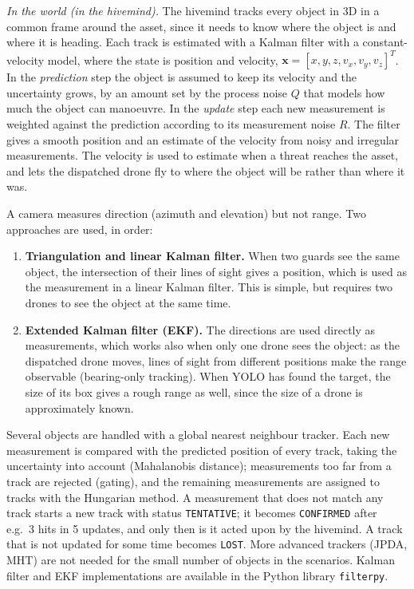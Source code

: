 \documentclass{article}
\begin{document}
\emph{In the world (in the hivemind).} The hivemind tracks every object in
3D in a common frame around the asset, since it needs to know where the
object is and where it is heading. Each track is estimated with a Kalman
filter with a constant-velocity model, where the state is position and
velocity, $\mathbf{x} = [x, y, z, v_x, v_y, v_z]^T$. In the
\emph{prediction} step the object is assumed to keep its velocity and the
uncertainty grows, by an amount set by the process noise $Q$ that models
how much the object can manoeuvre. In the \emph{update} step each new
measurement is weighted against the prediction according to its
measurement noise $R$. The filter gives a smooth position and an estimate
of the velocity from noisy and irregular measurements. The velocity is
used to estimate when a threat reaches the asset, and lets the dispatched
drone fly to where the object will be rather than where it was.

A camera measures direction (azimuth and elevation) but not range. Two
approaches are used, in order:
\begin{enumerate}
    \item \textbf{Triangulation and linear Kalman filter.} When two guards
          see the same object, the intersection of their lines of sight
          gives a position, which is used as the measurement in a linear
          Kalman filter. This is simple, but requires two drones to see
          the object at the same time.
    \item \textbf{Extended Kalman filter (EKF).} The directions are used
          directly as measurements, which works also when only one drone
          sees the object: as the dispatched drone moves, lines of sight
          from different positions make the range observable
          (bearing-only tracking). When YOLO has found the target, the
          size of its box gives a rough range as well, since the size of
          a drone is approximately known.
\end{enumerate}

Several objects are handled with a global nearest neighbour tracker. Each
new measurement is compared with the predicted position of every track,
taking the uncertainty into account (Mahalanobis distance); measurements
too far from a track are rejected (gating), and the remaining
measurements are assigned to tracks with the Hungarian method. A
measurement that does not match any track starts a new track with status
\texttt{TENTATIVE}; it becomes \texttt{CONFIRMED} after e.g.\ 3 hits in 5
updates, and only then is it acted upon by the hivemind. A track that is
not updated for some time becomes \texttt{LOST}. More advanced trackers
(JPDA, MHT) are not needed for the small number of objects in the
scenarios. Kalman filter and EKF implementations are available in the
Python library \texttt{filterpy}.
\end{document}

